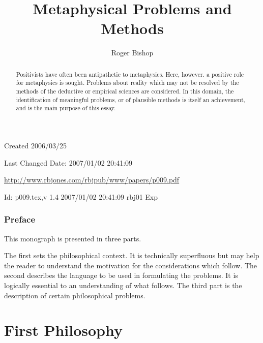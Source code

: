\documentclass{rbjk}
\begin{document}
                                                                                   
\begin{article}
\begin{opening}  
\title{Metaphysical Problems and Methods}
\author{Roger Bishop }

\begin{abstract}
Positivists have often been antipathetic to metaphysics.
Here, however. a positive role for metaphysics is sought.
Problems about reality which may not be resolved by the methods of the deductive or empirical sciences are considered.
In this domain, the identification of meaningful problems, or of plausible methods is itself an achievement, and is the main purpose of this essay. 
\end{abstract}
\end{opening}

\vfill

\begin{centering}
{\footnotesize
Created 2006/03/25

Last Changed $ $Date: 2007/01/02 20:41:09 $ $

\href{http://www.rbjones.com/rbjpub/www/papers/p009.pdf}
{http://www.rbjones.com/rbjpub/www/papers/p009.pdf}

$ $Id: p009.tex,v 1.4 2007/01/02 20:41:09 rbj01 Exp $ $

}%
\end{centering}

\newpage
\setcounter{tocdepth}{4}
{\parskip-0pt\tableofcontents}

\section{Preface}

This monograph is presented in three parts.

The first sets the philosophical context.
It is technically superfluous but may help the reader to understand the motivation for the considerations which follow.
The second describes the language to be used in formulating the problems.
It is logically essential to an understanding of what follows.
The third part is the description of certain philosophical problems.

\part{First Philosophy}


\end{article}
\end{document}
